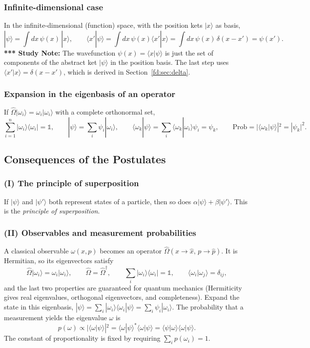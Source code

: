 \documentclass[11pt,a4paper]{article}
\begin{document}
\subsubsection*{Infinite-dimensional case}
In the infinite-dimensional (function) space, with the position kets $|x\rangle$ as basis,
\[
|\psi\rangle=\int dx\,\psi(x)\,|x\rangle,\qquad
\langle x'|\psi\rangle=\int dx\,\psi(x)\langle x'|x\rangle=\int dx\,\psi(x)\,\delta(x-x')=\psi(x').
\]
\textbf{*** Study Note:} The wavefunction $\psi(x)=\langle x|\psi\rangle$ is just the set of components of the abstract ket $|\psi\rangle$ in the position basis. The last step uses $\langle x'|x\rangle=\delta(x-x')$, which is derived in Section~\ref{fd:sec:delta}.

\subsubsection*{Expansion in the eigenbasis of an operator}
If $\hat\Omega|\omega_i\rangle=\omega_i|\omega_i\rangle$ with a complete orthonormal set,
\[
\sum_{i=1}^n|\omega_i\rangle\langle\omega_i|=\mathbb 1,\qquad
|\psi\rangle=\sum_i\psi_i|\omega_i\rangle,\qquad
\langle\omega_k|\psi\rangle=\sum_i\langle\omega_k|\omega_i\rangle\psi_i=\psi_k,\qquad
\text{Prob}=|\langle\omega_k|\psi\rangle|^2=|\psi_k|^2 .
\]

\subsection{Consequences of the Postulates}
\subsubsection*{(I) The principle of superposition}
If $|\psi\rangle$ and $|\psi'\rangle$ both represent states of a particle, then so does $\alpha|\psi\rangle+\beta|\psi'\rangle$. This is the \emph{principle of superposition}.

\subsubsection*{(II) Observables and measurement probabilities}
A classical observable $\omega(x,p)$ becomes an operator $\hat\Omega(x\to\hat x,\,p\to\hat p)$. It is Hermitian, so its eigenvectors satisfy
\[
\hat\Omega|\omega_i\rangle=\omega_i|\omega_i\rangle,\qquad
\hat\Omega=\hat\Omega^\dagger,\qquad
\sum_i|\omega_i\rangle\langle\omega_i|=\mathbb 1,\qquad
\langle\omega_i|\omega_j\rangle=\delta_{ij},
\]
and the last two properties are guaranteed for quantum mechanics (Hermiticity gives real eigenvalues, orthogonal eigenvectors, and completeness). Expand the state in this eigenbasis,
$|\psi\rangle=\sum_i|\omega_i\rangle\langle\omega_i|\psi\rangle=\sum_i\psi_i|\omega_i\rangle$.
The probability that a measurement yields the eigenvalue $\omega$ is
\[
p(\omega)\propto|\langle\omega|\psi\rangle|^2=\langle\omega|\psi\rangle^*\langle\omega|\psi\rangle=\langle\psi|\omega\rangle\langle\omega|\psi\rangle .
\]
The constant of proportionality is fixed by requiring $\sum_ip(\omega_i)=1$.
\end{document}
